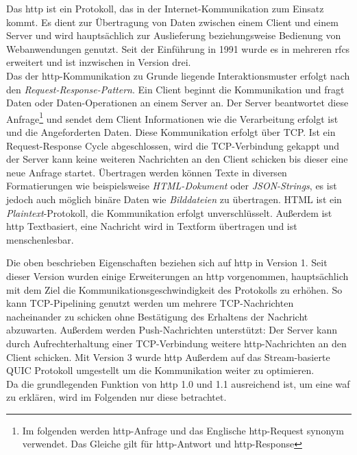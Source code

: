 Das \ac{http} ist ein Protokoll, das in der Internet-Kommunikation zum Einsatz kommt.
Es dient zur Übertragung von Daten zwischen einem Client und einem Server und wird hauptsächlich zur Auslieferung beziehungsweise Bedienung von Webanwendungen genutzt.
Seit der Einführung in 1991 wurde es in mehreren \acp{rfc} erweitert und ist inzwischen in Version drei\cite{onlineIETFErhebtHTTP2022}.\\

Das der \ac{http}-Kommunikation zu Grunde liegende Interaktionsmuster erfolgt nach den \textit{Request-Response-Pattern}.
Ein Client beginnt die Kommunikation und fragt Daten oder Daten-Operationen an einem Server an.
Der Server beantwortet diese Anfrage\footnote{Im folgenden werden \ac{http}-Anfrage und das Englische \ac{http}-Request synonym verwendet. Das Gleiche gilt für \ac{http}-Antwort und \ac{http}-Response} und sendet dem Client Informationen wie die Verarbeitung erfolgt ist und die Angeforderten Daten.
Diese Kommunikation erfolgt über TCP.
Ist ein Request-Response Cycle abgeschlossen, wird die TCP-Verbindung gekappt und der Server kann keine weiteren Nachrichten an den Client schicken bis dieser eine neue Anfrage startet.
Übertragen werden können Texte in diversen Formatierungen wie beispielsweise \textit{HTML-Dokument} oder \textit{JSON-Strings}, es ist jedoch auch möglich binäre Daten wie \textit{Bilddateien} zu übertragen.
HTML ist ein \textit{Plaintext}-Protokoll, die Kommunikation erfolgt unverschlüsselt.
Außerdem ist \ac{http} Textbasiert, eine Nachricht wird in Textform übertragen und ist menschenlesbar.

Die oben beschrieben Eigenschaften beziehen sich auf \ac{http} in Version 1.
Seit dieser Version wurden einige Erweiterungen an \ac{http} vorgenommen, hauptsächlich mit dem Ziel die Kommunikationsgeschwindigkeit des Protokolls zu erhöhen.
So kann TCP-Pipelining genutzt werden um mehrere TCP-Nachrichten nacheinander zu schicken ohne Bestätigung des Erhaltens der Nachricht abzuwarten.
Außerdem werden Push-Nachrichten unterstützt:
Der Server kann durch Aufrechterhaltung einer TCP-Verbindung weitere \ac{http}-Nachrichten an den Client schicken.
Mit Version 3 wurde \ac{http} Außerdem auf das Stream-basierte QUIC Protokoll umgestellt um die Kommunikation weiter zu optimieren\cite{OverviewHTTPHTTP2023}.\\

Da die grundlegenden Funktion von \ac{http} 1.0 und 1.1 ausreichend ist, um eine \ac{waf} zu erklären, wird im Folgenden nur diese betrachtet.

